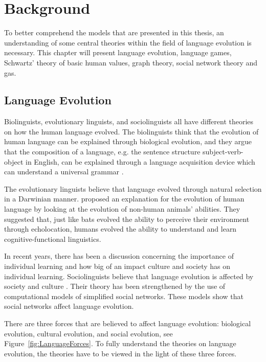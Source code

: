 \acresetall
\chapter{Background}\label{ch:background}
To better comprehend the models that are presented in this thesis, an understanding of some central theories within the field of language evolution is necessary. This chapter will present language evolution, language games, Schwartz' theory of basic human values, graph theory, social network theory and \acp{ga}.

\section{Language Evolution}
Biolinguists, evolutionary linguists, and sociolinguists all have different theories on how the human language evolved. The biolinguists think that the evolution of human language can be explained through biological evolution, and they argue that the composition of a language, e.g. the sentence structure subject-verb-object in English, can be explained through a language acquisition device which can understand a universal grammar \citep{chomsky1965some}.

The evolutionary linguists believe that language evolved through natural selection in a Darwinian manner. \citet{pinker1994regular} proposed an explanation for the evolution of human language by looking at the evolution of non-human animals' abilities. They suggested that, just like bats evolved the ability to perceive their environment through echolocation, humans evolved the ability to understand and learn cognitive-functional linguistics.

In recent years, there has been a discussion concerning the importance of individual learning and how big of an impact culture and society has on individual learning. Sociolinguists believe that language evolution is affected by society and culture \citep{tomasello2003makes}. Their theory has been strengthened by the use of computational models of simplified social networks. These models show that social networks affect language evolution.

\label{EvoltionaryForces}
There are three forces that are believed to affect language evolution: biological evolution, cultural evolution, and social evolution, see Figure~\ref{fig:LanguageForces}. To fully understand the theories on language evolution, the theories have to be viewed in the light of these three forces.

